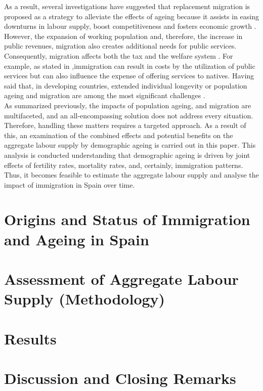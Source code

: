 \documentclass{article}
\begin{document}
As a result, several investigations have suggested that replacement migration is proposed as a strategy to alleviate the effects of ageing because it assists in easing downturns in labour supply, boost competitiveness and fosters economic growth \cite{stepanek2022sectoral, okamoto2021immigration, UNATIONS}. However, the expansion of working population and, therefore, the increase in public revenues, migration also creates additional needs for public services. Consequently, migration affects both the tax and the welfare system \cite{fiorio2023migration, naumann2021population}. For example, as stated in \cite{ preston2014effect},immigration can result in costs by the utilization of public services but can also influence the expense of offering services to natives. Having said that, in developing countries, extended individual longevity or population ageing and migration are among the most significant challenges \cite{ciobanu2020intersections}. \\

As summarized previously, the impacts of population ageing, and migration are multifaceted, and an all-encompassing solution does not address every situation. Therefore, handling these matters requires a targeted approach. As a result of this, an examination of the combined effects and potential benefits on the aggregate labour supply by demographic ageing is carried out in this paper. This analysis is conducted understanding that demographic ageing is driven by joint effects of fertility rates, mortality rates, and, certainly, immigration patterns. Thus, it becomes feasible to estimate the aggregate labour supply and analyse the impact of immigration in Spain over time. 

\section*{Origins and Status of Immigration and Ageing in Spain}


\section*{Assessment of Aggregate Labour Supply (Methodology)}


\section*{Results}

\section*{Discussion and Closing Remarks}



\end{document}
